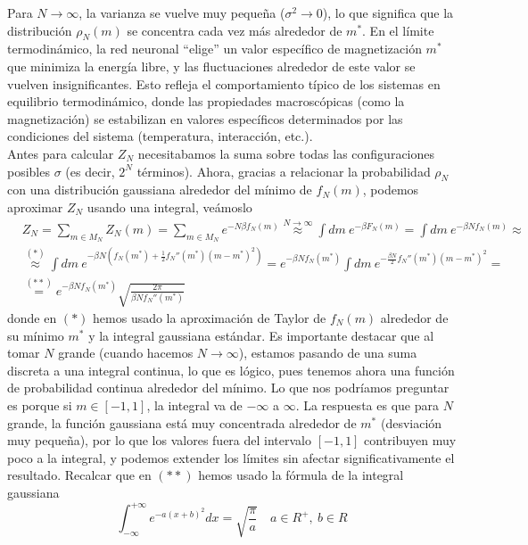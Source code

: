 \noindent
Para $N\to \infty$, la varianza se vuelve muy pequeña ($\sigma^2 \to 0$), lo que significa que la distribución $\rho_N(m)$ se concentra cada vez más alrededor de $m^*$. En el límite termodinámico, la red neuronal ``elige'' un valor específico de magnetización $m^*$ que minimiza la energía libre, y las fluctuaciones alrededor de este valor se vuelven insignificantes. Esto refleja el comportamiento típico de los sistemas en equilibrio termodinámico, donde las propiedades macroscópicas (como la magnetización) se estabilizan en valores específicos determinados por las condiciones del sistema (temperatura, interacción, etc.). \\

\noindent
Antes para calcular $Z_N$ necesitabamos la suma sobre todas las configuraciones posibles $\sigma$ (es decir, $2^N$ términos). Ahora, gracias a relacionar la probabilidad $\rho_N$ con una distribución gaussiana alrededor del mínimo de $f_N(m)$, podemos aproximar $Z_N$ usando una integral, veámoslo
\begin{align*}
    &Z_N = \sum_{m\in M_N} Z_N(m) =\sum_{m\in M_N}e^{-N\beta f_N(m)}\overset{N\to \infty}{\approx} \int dm \ e^{-\beta F_N(m)} = \int dm \ e^{-\beta N f_N(m)} \approx \\
    &\overset{(*)}{\approx} \int dm \ e^{-\beta N \left( f_N(m^*) + \frac{1}{2} f_N''(m^*)(m - m^*)^2 \right)} = e^{-\beta N f_N(m^*)} \int dm \ e^{-\frac{\beta N}{2} f_N''(m^*)(m - m^*)^2} = \\
    &\overset{(**)}{=} e^{-\beta N f_N(m^*)} \sqrt{\frac{2\pi}{\beta N f_N''(m^*)}}
\end{align*}
donde en $(*)$ hemos usado la aproximación de Taylor de $f_N(m)$ alrededor de su mínimo $m^*$ y la integral gaussiana estándar. Es importante destacar que al tomar $N$ grande (cuando hacemos $N\to \infty$), estamos pasando de una suma discreta a una integral continua, lo que es lógico, pues tenemos ahora una función de probabilidad continua alrededor del mínimo. Lo que nos podríamos preguntar es porque si $m\in [-1,1]$, la integral va de $-\infty$ a $\infty$. La respuesta es que para $N$ grande, la función gaussiana está muy concentrada alrededor de $m^*$ (desviación muy pequeña), por lo que los valores fuera del intervalo $[-1,1]$ contribuyen muy poco a la integral, y podemos extender los límites sin afectar significativamente el resultado. Recalcar que en $(**)$ hemos usado la fórmula de la integral gaussiana
\begin{equation*}
    \int_{-\infty}^{+\infty} e^{-a(x + b)^2} dx = \sqrt{\frac{\pi}{a}} \quad a\in R^+, \ b\in R
\end{equation*}

